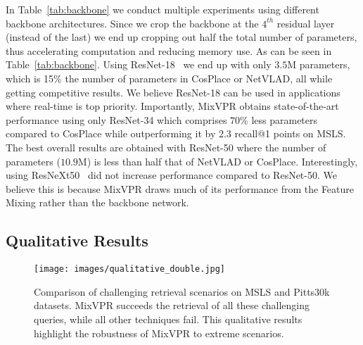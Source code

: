 \documentclass[10pt,twocolumn,letterpaper]{article}
\begin{document}
In Table~\ref{tab:backbone} we conduct multiple experiments using different backbone architectures. Since we crop the backbone at the $4^{th}$ residual layer (instead of the last) we end up cropping out half the total number of parameters, thus accelerating computation and reducing memory use. As can be seen in Table~\ref{tab:backbone}. Using ResNet-18~\cite{he2016deep} we end up with only $3.5$M parameters, which is 15\% the number of parameters in CosPlace or NetVLAD, all while getting competitive results. We believe ResNet-18 can be used in applications where real-time is top priority. Importantly, MixVPR obtains state-of-the-art performance using only ResNet-34 which comprises $70$\% less parameters compared to CosPlace while outperforming it by $2.3$ recall@1 points on MSLS. The best overall results are obtained with ResNet-50 where the number of parameters ($10.9$M) is less than half that of NetVLAD or CosPlace. Interestingly, using ResNeXt50~\cite{xie2017aggregated} did not increase performance compared to ResNet-50. We believe this is because MixVPR  draws much of its performance from the Feature Mixing rather than the backbone network.

\subsection{Qualitative Results}
\begin{figure*}
\begin{center}
\texttt{[image: images/qualitative\_double.jpg]}
\end{center}
   \caption{Comparison of challenging retrieval scenarios on MSLS and Pitts30k datasets. MixVPR succeeds the retrieval of all these challenging queries, while all other techniques fail. This qualitative results highlight the robustness of MixVPR to extreme scenarios.}
\label{fig:fails}
\end{figure*}
\end{document}

